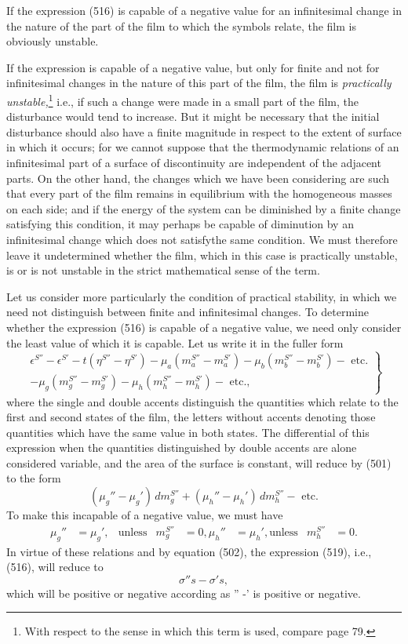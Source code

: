 \documentclass[12pt]{memoir}
\begin{document}
{If the expression (516) is capable of a negative value for an infinitesimal change in the nature of the part of the film to which the symbols relate, the film is obviously unstable.

If the expression is capable of a negative value, but only for finite and not for infinitesimal changes in the nature of this part of the film, the film is \textit{practically unstable,}\footnote{With respect to the sense in which this term is used, compare page 79.} i.e., if such a change were made in a small part of the film, the disturbance would tend to increase. But it might be necessary that the initial disturbance should also have a finite magnitude in respect to the extent of surface in which it occurs; for we cannot suppose that the thermodynamic relations of an infinitesimal part of a surface of discontinuity are independent of the adjacent parts. On the other hand, the changes which we have been considering are such that every part of the film remains in equilibrium with the homogeneous masses on each side; and if the energy of the system can be diminished by a finite change satisfying this condition, it may perhaps be capable of diminution by an infinitesimal change which does not satisfythe same condition. We must therefore leave it undetermined whether the film, which in this case is practically unstable, is or is not unstable in the strict mathematical sense of the term.

Let us consider more particularly the condition of practical stability, in which we need not distinguish between finite and infinitesimal changes. To determine whether the expression (516) is capable of a negative value, we need only consider the least value of which it is capable. Let us write it in the fuller form
\begin{equation}
\left. \begin{array}{r} \epsilon^{S''}-\epsilon^{S'}- t(\eta^{S''}- \eta^{S'})-\mu_a(m_a^{S''}-m_a^{S'})-\mu_b(m_b^{S''}-m_b^{S'})-\text{ etc.}  \\
-\mu_g(m_g^{S''}-m_g^{S'})-\mu_h(m_h^{S''}-m_h^{S'}) - \text{ etc.}, \end{array} \right\} \label{519}\end{equation}
where the single and double accents distinguish the quantities which relate to the first and second states of the film, the letters without accents denoting those quantities which have the same value in both states. The differential of this expression when the quantities distinguished by double accents are alone considered variable, and the area of the surface is constant, will reduce by (501) to the form
$$ (\mu_g''-\mu_g') \, d m_g^{S''}+(\mu_h''-\mu_h') \, d m_h^{S''}- \text{ etc.} $$
To make this incapable of a negative value, we must have
\begin{align*}
\mu_g'' &= \mu_g', & \text{unless} & m_g^{S''} &= 0,
\mu_h'' &= \mu_h', \text{unless} & m_h^{S''} &= 0. \end{align*}
In virtue of these relations and by equation (502), the expression (519), i.e., (516), will reduce to
$$\sigma''s - \sigma's,$$
which will be positive or negative according as
\eqs \sigma'' -\sigma'  \label{520} \eqe
is positive or negative.

}
\end{document}
